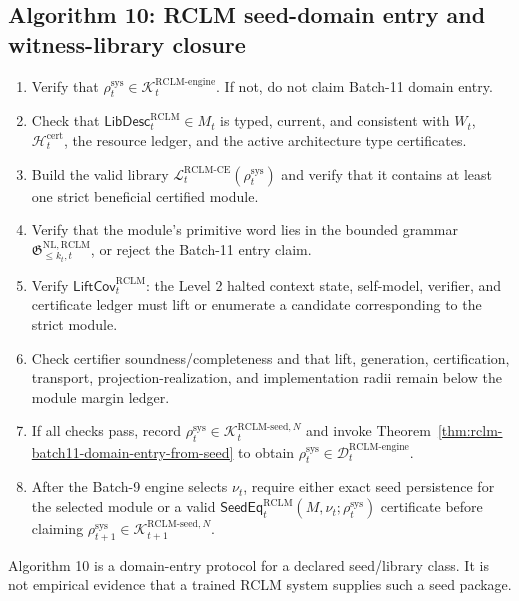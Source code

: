 \documentclass[11pt,a4paper]{article}
\newcommand{\Lcal}{\mathcal L}
\newcommand{\Kcal}{\mathcal K}
\newcommand{\Dcal}{\mathcal D}
\newcommand{\RCLM}{\mathrm{RCLM}}
\newcommand{\sys}{\mathrm{sys}}
\newcommand{\cert}{\mathrm{cert}}
\newcommand{\engine}{\mathrm{engine}}
\newcommand{\NL}{\mathrm{NL}}
\newcommand{\CE}{\mathrm{CE}}
\begin{document}
\subsection*{Algorithm 10: RCLM seed-domain entry and witness-library closure}
\begin{enumerate}[label=(\arabic*),leftmargin=1.5em]
    \item Verify that \(\rho_t^{\sys}\in\Kcal_t^{\RCLM\text{-}\engine}\).  If not, do not claim Batch-11 domain entry.
    \item Check that \(\mathsf{LibDesc}_t^{\RCLM}\in M_t\) is typed, current, and consistent with \(W_t\), \(\mathcal H_t^{\cert}\), the resource ledger, and the active architecture type certificates.
    \item Build the valid library \(\Lcal_t^{\RCLM\text{-}\CE}(\rho_t^{\sys})\) and verify that it contains at least one strict beneficial certified module.
    \item Verify that the module's primitive word lies in the bounded grammar \(\mathfrak G_{\le k_t,t}^{\NL,\RCLM}\), or reject the Batch-11 entry claim.
    \item Verify \(\mathsf{LiftCov}_t^{\RCLM}\): the Level 2 halted context state, self-model, verifier, and certificate ledger must lift or enumerate a candidate corresponding to the strict module.
    \item Check certifier soundness/completeness and that lift, generation, certification, transport, projection-realization, and implementation radii remain below the module margin ledger.
    \item If all checks pass, record \(\rho_t^{\sys}\in\Kcal_t^{\RCLM\text{-}\mathrm{seed},N}\) and invoke Theorem~\ref{thm:rclm-batch11-domain-entry-from-seed} to obtain \(\rho_t^{\sys}\in\Dcal_t^{\RCLM\text{-}\engine}\).
    \item After the Batch-9 engine selects \(\nu_t\), require either exact seed persistence for the selected module or a valid \(\mathsf{SeedEq}_t^{\RCLM}(M,\nu_t;\rho_t^{\sys})\) certificate before claiming \(\rho_{t+1}^{\sys}\in\Kcal_{t+1}^{\RCLM\text{-}\mathrm{seed},N}\).
\end{enumerate}
Algorithm 10 is a domain-entry protocol for a declared seed/library class.  It is not empirical evidence that a trained RCLM system supplies such a seed package.
\end{document}
